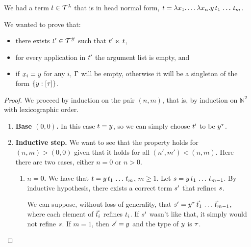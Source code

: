 
We had a term $t \in \mathcal{T}^{\lambda}$ that is in head normal form,
\ie $t = \lambda x_1. \hdots\lambda x_n. y\,t_1\,\hdots\,t_m$.

We wanted to prove that:
  \begin{itemize}
    \item there exists $t' \in \mathcal{T}^{\mathtt{\#}}$ such that $t' \mathrel{\ltimes} t$,
    \item for every application in $t'$ the argument list is empty, and
    \item if $x_i = y$ for any $i$, $\Gamma$ will be empty,
      otherwise it will be a singleton of the form $\{y : [\tau]\}$.
  \end{itemize}

\begin{proof}
We proceed by induction on the pair $(n, m)$, that is, by induction on
  $\mathbb{N}^2$ with lexicographic order.
\begin{enumerate}
  \item {\bf Base $(0, 0)$.} In this case $t = y$,
    so we can simply choose $t'$ to be $y^\tau$.
  \item {\bf Inductive step.} We want to see that the property holds for
    $(n, m) > (0,0)$ given that it holds for all $(n', m') < (n, m)$.
    Here there are two cases, either $n = 0$ or $n > 0$.
    \begin{enumerate}
      \item {\bf $n = 0$.} We have that $t = y\,t_1\,\hdots\,t_m$, $m \geq 1$.
        Let $s = y\,t_1\,\hdots\,t_{m-1}$.
        By inductive hypothesis, there exists a correct term $s'$ that
          refines $s$.

        We can suppose, without loss of generality, that
          $s' = y^\tau\,\vec{t}_1\,\hdots\,\vec{t}_{m-1}$,
        where each element of $\vec{t}_i$ refines $t_i$.
        If $s'$ wasn't like that, it simply would not refine $s$.
        If $m = 1$, then $s' = y$ and the type of $y$ is $\tau$.


\end{enumerate}
\end{enumerate}
\end{proof}
